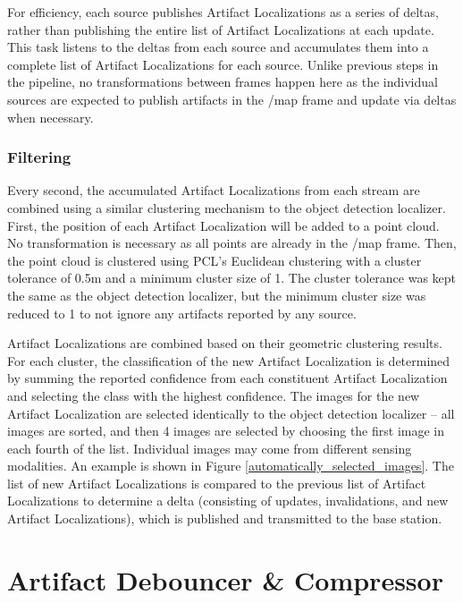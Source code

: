 For efficiency, each source publishes Artifact Localizations as a series of deltas, rather than publishing the entire list of Artifact Localizations at each update. This task listens to the deltas from each source and accumulates them into a complete list of Artifact Localizations for each source. Unlike previous steps in the pipeline, no transformations between frames happen here as the individual sources are expected to publish artifacts in the /map frame and update via deltas when necessary.

\subsubsection{Filtering} 

Every second, the accumulated Artifact Localizations from each stream are combined using a similar clustering mechanism to the object detection localizer. First, the position of each Artifact Localization will be added to a point cloud. No transformation is necessary as all points are already in the /map frame. Then, the point cloud is clustered using PCL's Euclidean clustering with a cluster tolerance of 0.5m and a minimum cluster size of 1. The cluster tolerance was kept the same as the object detection localizer, but the minimum cluster size was reduced to 1 to not ignore any artifacts reported by any source.
	
Artifact Localizations are combined based on their geometric clustering results. For each cluster, the classification of the new Artifact Localization is determined by summing the reported confidence from each constituent Artifact Localization and selecting the class with the highest confidence. The images for the new Artifact Localization are selected identically to the object detection localizer -- all images are sorted, and then 4 images are selected by choosing the first image in each fourth of the list. Individual images may come from different sensing modalities. An example is shown in Figure \ref{automatically_selected_images}. The list of new Artifact Localizations is compared to the previous list of Artifact Localizations to determine a delta (consisting of updates, invalidations, and new Artifact Localizations), which is published and transmitted to the base station.
	
\section{Artifact Debouncer \& Compressor}


